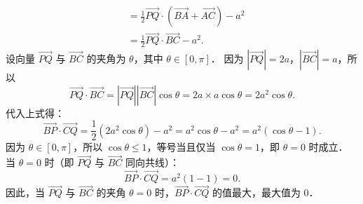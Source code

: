 \begin{answer}
\[\begin{aligned}
&= \frac{1}{2}\overrightarrow{PQ} \cdot (\overrightarrow{BA} + \overrightarrow{AC}) - a^2 \\
&= \frac{1}{2}\overrightarrow{PQ} \cdot \overrightarrow{BC} - a^2.
\end{aligned}
\]
设向量 $\overrightarrow{PQ}$ 与 $\overrightarrow{BC}$ 的夹角为 $\theta$，其中 $\theta \in [0, \pi]$．
因为 $|\overrightarrow{PQ}| = 2a$，$|\overrightarrow{BC}| = a$，所以
\nopagebreak[4]
\[
\overrightarrow{PQ} \cdot \overrightarrow{BC} = |\overrightarrow{PQ}| |\overrightarrow{BC}| \cos\theta = 2a \times a \cos\theta = 2a^2 \cos\theta.
\]
代入上式得：
\nopagebreak[4]
\[
\overrightarrow{BP} \cdot \overrightarrow{CQ} = \frac{1}{2}(2a^2 \cos\theta) - a^2 = a^2\cos\theta - a^2 = a^2(\cos\theta - 1).
\]
因为 $\theta \in [0, \pi]$，所以 $\cos\theta \leqslant 1$，等号当且仅当 $\cos\theta = 1$，即 $\theta = 0$ 时成立．
当 $\theta = 0$ 时（即 $\overrightarrow{PQ}$ 与 $\overrightarrow{BC}$ 同向共线）：
\nopagebreak[4]
\[
\overrightarrow{BP} \cdot \overrightarrow{CQ} = a^2(1 - 1) = 0.
\]
因此，当 $\overrightarrow{PQ}$ 与 $\overrightarrow{BC}$ 的夹角 $\theta = 0$ 时，$\overrightarrow{BP} \cdot \overrightarrow{CQ}$ 的值最大，最大值为 $0$．


\end{answer}
